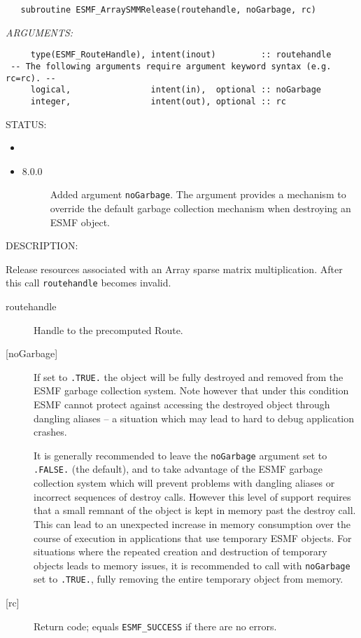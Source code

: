   
\begin{verbatim}   subroutine ESMF_ArraySMMRelease(routehandle, noGarbage, rc)\end{verbatim}{\em ARGUMENTS:}
\begin{verbatim}     type(ESMF_RouteHandle), intent(inout)         :: routehandle
 -- The following arguments require argument keyword syntax (e.g. rc=rc). --
     logical,                intent(in),  optional :: noGarbage
     integer,                intent(out), optional :: rc\end{verbatim}
{\sf STATUS:}
   \begin{itemize}
   \item{}
   \item{}
   \begin{description}
   \item[8.0.0] Added argument {\tt noGarbage}.
     The argument provides a mechanism to override the default garbage collection
     mechanism when destroying an ESMF object.
   \end{description}
   \end{itemize}
  
{\sf DESCRIPTION:\\ }


     Release resources associated with an Array sparse matrix multiplication. 
     After this call {\tt routehandle} becomes invalid.
  
     \begin{description}
     \item [routehandle]
       Handle to the precomputed Route.
     \item[{[noGarbage]}]
       If set to {\tt .TRUE.} the object will be fully destroyed and removed
       from the ESMF garbage collection system. Note however that under this 
       condition ESMF cannot protect against accessing the destroyed object 
       through dangling aliases -- a situation which may lead to hard to debug 
       application crashes.
   
       It is generally recommended to leave the {\tt noGarbage} argument
       set to {\tt .FALSE.} (the default), and to take advantage of the ESMF 
       garbage collection system which will prevent problems with dangling
       aliases or incorrect sequences of destroy calls. However this level of
       support requires that a small remnant of the object is kept in memory
       past the destroy call. This can lead to an unexpected increase in memory
       consumption over the course of execution in applications that use 
       temporary ESMF objects. For situations where the repeated creation and 
       destruction of temporary objects leads to memory issues, it is 
       recommended to call with {\tt noGarbage} set to {\tt .TRUE.}, fully 
       removing the entire temporary object from memory.
     \item [{[rc]}]
       Return code; equals {\tt ESMF\_SUCCESS} if there are no errors.
     \end{description}
   
